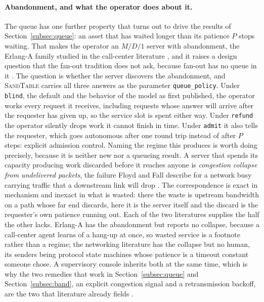 \documentclass[11pt]{article}
\newcommand{\sandtable}{\textsc{SandTable}}
\begin{document}
\paragraph{Abandonment, and what the operator does about it.} The queue has one further property that turns out to drive the results of Section~\ref{subsec:queue}: an asset that has waited longer than its patience $P$ stops waiting. That makes the operator an $M/D/1$ server with abandonment, the Erlang-A family studied in the call-center literature \citep{garnett2002impatient,gans2003callcenters}, and it raises a design question that the fan-out tradition does not ask, because fan-out has no queue in it \citep{olsen2004fanout,cummings2008predicting}. The question is whether the server discovers the abandonment, and \sandtable{} carries all three answers as the parameter \texttt{queue\_policy}. Under \texttt{blind}, the default and the behavior of the model as first published, the operator works every request it receives, including requests whose answer will arrive after the requester has given up, so the service slot is spent either way. Under \texttt{refund} the operator silently drops work it cannot finish in time. Under \texttt{admit} it also tells the requester, which goes autonomous after one round trip instead of after $P$ steps: explicit admission control. Naming the regime this produces is worth doing precisely, because it is neither new nor a queueing result. A server that spends its capacity producing work discarded before it reaches anyone is \emph{congestion collapse from undelivered packets}, the failure Floyd and Fall describe for a network busy carrying traffic that a downstream link will drop \citep{floyd1999congestion}. The correspondence is exact in mechanism and inexact in what is wasted: there the waste is upstream bandwidth on a path whose far end discards, here it is the server itself and the discard is the requester's own patience running out. Each of the two literatures supplies the half the other lacks. Erlang-A has the abandonment but reports no collapse, because a call-center agent learns of a hang-up at once, so wasted service is a footnote rather than a regime; the networking literature has the collapse but no human, its senders being protocol state machines whose patience is a timeout constant someone chose. A supervisory console inherits both at the same time, which is why the two remedies that work in Section~\ref{subsec:queue} and Section~\ref{subsec:band}, an explicit congestion signal and a retransmission backoff, are the two that literature already fields \citep{jacobson1988congestion}.
\end{document}
